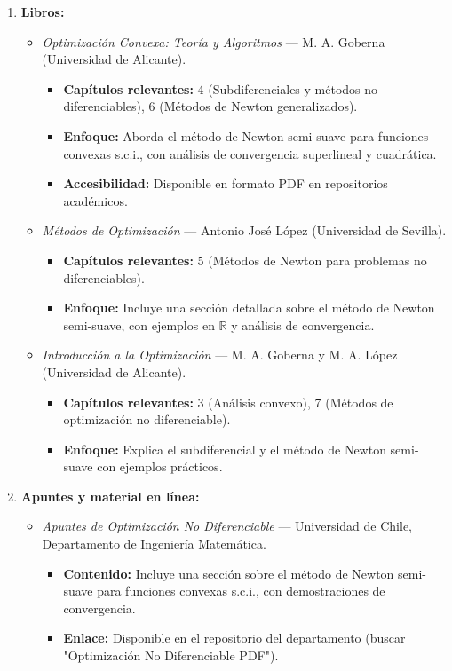 \documentclass[12pt]{book}
\theoremstyle{definition}
\theoremstyle{plain}
\theoremstyle{remark}
\begin{document}
\begin{enumerate}
    \item \textbf{Libros:}
      \begin{itemize}
        \item \textit{Optimización Convexa: Teoría y Algoritmos} — M. A. Goberna (Universidad de Alicante).
          \begin{itemize}
            \item \textbf{Capítulos relevantes:} 4 (Subdiferenciales y métodos no diferenciables), 6 (Métodos de Newton generalizados).
            \item \textbf{Enfoque:} Aborda el método de Newton semi-suave para funciones convexas s.c.i., con análisis de convergencia superlineal y cuadrática.
            \item \textbf{Accesibilidad:} Disponible en formato PDF en repositorios académicos.
          \end{itemize}

        \item \textit{Métodos de Optimización} — Antonio José López (Universidad de Sevilla).
          \begin{itemize}
            \item \textbf{Capítulos relevantes:} 5 (Métodos de Newton para problemas no diferenciables).
            \item \textbf{Enfoque:} Incluye una sección detallada sobre el método de Newton semi-suave, con ejemplos en \( \mathbb{R} \) y análisis de convergencia.
          \end{itemize}

        \item \textit{Introducción a la Optimización} — M. A. Goberna y M. A. López (Universidad de Alicante).
          \begin{itemize}
            \item \textbf{Capítulos relevantes:} 3 (Análisis convexo), 7 (Métodos de optimización no diferenciable).
            \item \textbf{Enfoque:} Explica el subdiferencial y el método de Newton semi-suave con ejemplos prácticos.
          \end{itemize}
      \end{itemize}

    \item \textbf{Apuntes y material en línea:}
      \begin{itemize}
        \item \textit{Apuntes de Optimización No Diferenciable} — Universidad de Chile, Departamento de Ingeniería Matemática.
          \begin{itemize}
            \item \textbf{Contenido:} Incluye una sección sobre el método de Newton semi-suave para funciones convexas s.c.i., con demostraciones de convergencia.
            \item \textbf{Enlace:} Disponible en el repositorio del departamento (buscar "Optimización No Diferenciable PDF").
          \end{itemize}


\end{itemize}
\end{enumerate}
\end{document}
